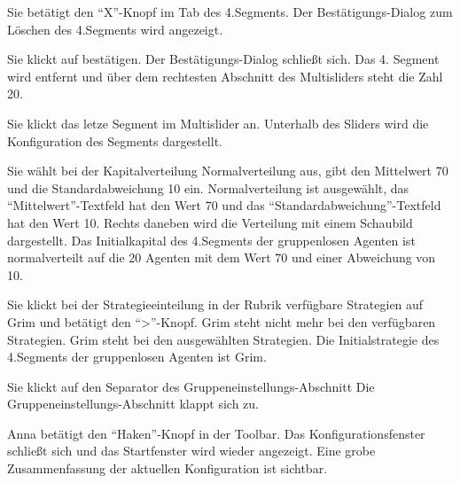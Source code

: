 \documentclass[parskip=full,11pt]{scrartcl}
\begin{document}
{Sie betätigt den \enquote{X}-Knopf im Tab des 4.Segments.}
{Der Bestätigungs-Dialog zum Löschen des 4.Segments wird angezeigt.}

{Sie klickt auf bestätigen.}
{Der Bestätigungs-Dialog schließt sich. Das 4. Segment wird entfernt und über dem rechtesten Abschnitt des Multisliders steht die Zahl 20.}

{Sie klickt das letze Segment im Multislider an.}
{Unterhalb des Sliders wird die Konfiguration des Segments dargestellt.}

{Sie wählt bei der Kapitalverteilung Normalverteilung aus, gibt den Mittelwert 70 und die Standardabweichung 10 ein.}
{Normalverteilung ist ausgewählt, das \enquote{Mittelwert}-Textfeld hat den Wert 70 und das \enquote{Standardabweichung}-Textfeld hat den Wert 10. Rechts daneben wird die Verteilung mit einem Schaubild dargestellt. Das Initialkapital des 4.Segments der gruppenlosen Agenten ist normalverteilt auf die 20 Agenten mit dem Wert 70 und einer Abweichung von 10.}

{Sie klickt bei der Strategieeinteilung in der Rubrik verfügbare Strategien auf Grim und betätigt den \enquote{>}-Knopf.}
{Grim steht nicht mehr bei den verfügbaren Strategien. Grim steht bei den ausgewählten Strategien. Die Initialstrategie des 4.Segments der gruppenlosen Agenten ist Grim.}

{Sie klickt auf den Separator des Gruppeneinstellungs-Abschnitt}
{Die Gruppeneinstellungs-Abschnitt klappt sich zu.}

{Anna betätigt den \enquote{Haken}-Knopf in der Toolbar.}
{Das Konfigurationsfenster schließt sich und das Startfenster wird wieder angezeigt. Eine grobe Zusammenfassung der aktuellen Konfiguration ist sichtbar.}
\end{document}
